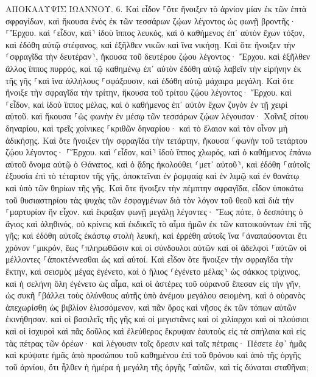 \documentclass[twoside, 9pt]{extreport}
\begin{document}
ΑΠΟΚΑΛΥΨΙΣ ΙΩΑΝΝΟΥ.
6.
Καὶ εἶδον ⸀ὅτε ἤνοιξεν τὸ ἀρνίον μίαν ἐκ τῶν ἑπτὰ σφραγίδων, καὶ ἤκουσα ἑνὸς ἐκ τῶν τεσσάρων ζῴων λέγοντος ὡς φωνῇ βροντῆς· ⸀Ἔρχου. 
καὶ ⸂εἶδον, καὶ⸃ ἰδοὺ ἵππος λευκός, καὶ ὁ καθήμενος ἐπ᾽ αὐτὸν ἔχων τόξον, καὶ ἐδόθη αὐτῷ στέφανος, καὶ ἐξῆλθεν νικῶν καὶ ἵνα νικήσῃ. 
Καὶ ὅτε ἤνοιξεν τὴν ⸂σφραγῖδα τὴν δευτέραν⸃, ἤκουσα τοῦ δευτέρου ζῴου λέγοντος· Ἔρχου. 
καὶ ἐξῆλθεν ἄλλος ἵππος πυρρός, καὶ τῷ καθημένῳ ἐπ᾽ αὐτὸν ἐδόθη αὐτῷ λαβεῖν τὴν εἰρήνην ἐκ τῆς γῆς ⸀καὶ ἵνα ἀλλήλους ⸀σφάξουσιν, καὶ ἐδόθη αὐτῷ μάχαιρα μεγάλη. 
Καὶ ὅτε ἤνοιξε τὴν σφραγῖδα τὴν τρίτην, ἤκουσα τοῦ τρίτου ζῴου λέγοντος· Ἔρχου. καὶ ⸀εἶδον, καὶ ἰδοὺ ἵππος μέλας, καὶ ὁ καθήμενος ἐπ᾽ αὐτὸν ἔχων ζυγὸν ἐν τῇ χειρὶ αὐτοῦ. 
καὶ ἤκουσα ⸀ὡς φωνὴν ἐν μέσῳ τῶν τεσσάρων ζῴων λέγουσαν· Χοῖνιξ σίτου δηναρίου, καὶ τρεῖς χοίνικες ⸀κριθῶν δηναρίου· καὶ τὸ ἔλαιον καὶ τὸν οἶνον μὴ ἀδικήσῃς. 
Καὶ ὅτε ἤνοιξεν τὴν σφραγῖδα τὴν τετάρτην, ἤκουσα ⸀φωνὴν τοῦ τετάρτου ζῴου λέγοντος· ⸀Ἔρχου. 
καὶ ⸂εἶδον, καὶ⸃ ἰδοὺ ἵππος χλωρός, καὶ ὁ καθήμενος ἐπάνω αὐτοῦ ὄνομα αὐτῷ ὁ Θάνατος, καὶ ὁ ᾅδης ἠκολούθει ⸂μετ᾽ αὐτοῦ⸃, καὶ ἐδόθη ⸀αὐτοῖς ἐξουσία ἐπὶ τὸ τέταρτον τῆς γῆς, ἀποκτεῖναι ἐν ῥομφαίᾳ καὶ ἐν λιμῷ καὶ ἐν θανάτῳ καὶ ὑπὸ τῶν θηρίων τῆς γῆς. 
Καὶ ὅτε ἤνοιξεν τὴν πέμπτην σφραγῖδα, εἶδον ὑποκάτω τοῦ θυσιαστηρίου τὰς ψυχὰς τῶν ἐσφαγμένων διὰ τὸν λόγον τοῦ θεοῦ καὶ διὰ τὴν ⸀μαρτυρίαν ἣν εἶχον. 
καὶ ἔκραξαν φωνῇ μεγάλῃ λέγοντες· Ἕως πότε, ὁ δεσπότης ὁ ἅγιος καὶ ἀληθινός, οὐ κρίνεις καὶ ἐκδικεῖς τὸ αἷμα ἡμῶν ἐκ τῶν κατοικούντων ἐπὶ τῆς γῆς; 
καὶ ἐδόθη αὐτοῖς ἑκάστῳ στολὴ λευκή, καὶ ἐρρέθη αὐτοῖς ἵνα ⸀ἀναπαύσονται ἔτι χρόνον ⸀μικρόν, ἕως ⸀πληρωθῶσιν καὶ οἱ σύνδουλοι αὐτῶν καὶ οἱ ἀδελφοὶ ⸀αὐτῶν οἱ μέλλοντες ⸀ἀποκτέννεσθαι ὡς καὶ αὐτοί. 
Καὶ εἶδον ὅτε ἤνοιξεν τὴν σφραγῖδα τὴν ἕκτην, καὶ σεισμὸς μέγας ἐγένετο, καὶ ὁ ἥλιος ⸂ἐγένετο μέλας⸃ ὡς σάκκος τρίχινος, καὶ ἡ σελήνη ὅλη ἐγένετο ὡς αἷμα, 
καὶ οἱ ἀστέρες τοῦ οὐρανοῦ ἔπεσαν εἰς τὴν γῆν, ὡς συκῆ ⸀βάλλει τοὺς ὀλύνθους αὐτῆς ὑπὸ ἀνέμου μεγάλου σειομένη, 
καὶ ὁ οὐρανὸς ἀπεχωρίσθη ὡς βιβλίον ἑλισσόμενον, καὶ πᾶν ὄρος καὶ νῆσος ἐκ τῶν τόπων αὐτῶν ἐκινήθησαν. 
καὶ οἱ βασιλεῖς τῆς γῆς καὶ οἱ μεγιστᾶνες καὶ οἱ χιλίαρχοι καὶ οἱ πλούσιοι καὶ οἱ ἰσχυροὶ καὶ πᾶς δοῦλος καὶ ἐλεύθερος ἔκρυψαν ἑαυτοὺς εἰς τὰ σπήλαια καὶ εἰς τὰς πέτρας τῶν ὀρέων· 
καὶ λέγουσιν τοῖς ὄρεσιν καὶ ταῖς πέτραις· Πέσετε ἐφ᾽ ἡμᾶς καὶ κρύψατε ἡμᾶς ἀπὸ προσώπου τοῦ καθημένου ἐπὶ τοῦ θρόνου καὶ ἀπὸ τῆς ὀργῆς τοῦ ἀρνίου, 
ὅτι ἦλθεν ἡ ἡμέρα ἡ μεγάλη τῆς ὀργῆς ⸀αὐτῶν, καὶ τίς δύναται σταθῆναι; 
\end{document}
